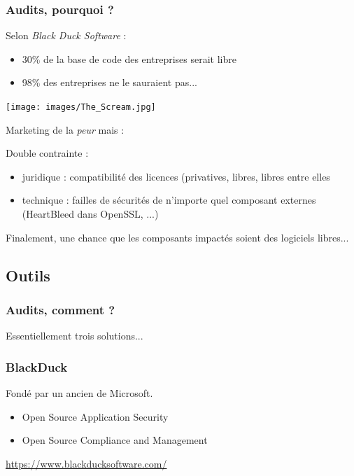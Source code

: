 \documentclass{beamer}
\begin{document}
\begin{frame}\frametitle{Audits, pourquoi ?}

  Selon \textit{Black Duck Software} :
  \begin{itemize}
  \item 30\% de la base de code des entreprises serait libre
  \item 98\% des entreprises ne le sauraient pas...

  \end{itemize}
  \begin{minipage}[c]{0.4\linewidth}
    \texttt{[image: images/The\_Scream.jpg]}\end{minipage}
  \begin{minipage}[c]{0.5\linewidth}
    Marketing de la \textit{peur} mais :

    Double contrainte :
    \begin{itemize}
    \item juridique : compatibilité des licences (privatives, libres,
      libres entre elles
    \item technique : failles de sécurités de n'importe quel composant
      externes (HeartBleed dans OpenSSL, ...)
    \end{itemize}
  \end{minipage}
  Finalement, une chance que les composants impactés soient des
  logiciels libres...
  
\end{frame}

\subsection{Outils}

\begin{frame}\frametitle{Audits, comment ?}

  Essentiellement trois solutions...

\end{frame}


\begin{frame}\frametitle{BlackDuck}
  Fondé par un ancien de Microsoft.

  \begin{itemize}
  \item Open Source Application Security
  \item Open Source Compliance and Management
  \end{itemize}

  \url{https://www.blackducksoftware.com/}
\end{frame}
\end{document}
